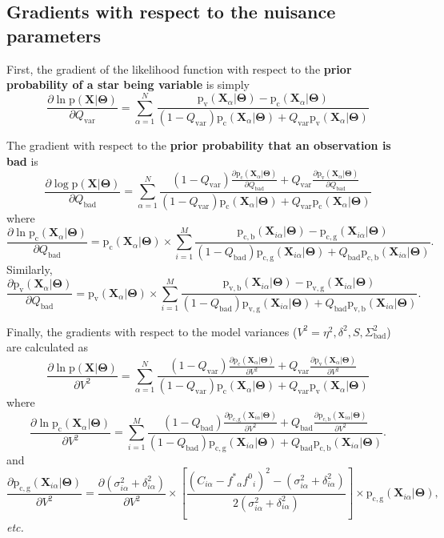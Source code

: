\documentclass[12pt,preprint]{aastex}
\newcommand{\foreign}[1]{\emph{#1}}
\newcommand{\paramvector}[1]{\boldsymbol{#1}}
\newcommand{\grad}[2]{\frac{\partial #1}{\partial #2}}
\renewcommand{\Pr}{\mathrm{p}}
\newcommand{\model}     {\ensuremath{\paramvector{\Theta}} }
\newcommand{\data}      {\ensuremath{\mathbf{X}} }
\newcommand{\X}         {\ensuremath{\mathbf{X}} }
\newcommand{\fstar}     {\ensuremath{f^*} }
\newcommand{\fzero}     {\ensuremath{f^0}}
\newcommand{\jabs}      {\ensuremath{\delta} }
\newcommand{\jrel}      {\ensuremath{\eta} }
\newcommand{\jitter}[1] {\ensuremath{\delta_{#1}^2} }
\newcommand{\Stot}      {\ensuremath{\sigma_{i\alpha}^2 + \jitter{i\alpha}} }
\newcommand{\Sbad}      {\ensuremath{\Sigma_\mathrm{bad}^2} }
\newcommand{\Qbad}      {\ensuremath{Q_\mathrm{bad}} }
\newcommand{\Qvar}      {\ensuremath{Q_\mathrm{var}} }
\newcommand{\Svar}      {\ensuremath{S} }
\newcommand{\pconst}    {\ensuremath{\Pr_\mathrm{c} (\X_\alpha | \model) }}
\newcommand{\pvar}      {\ensuremath{\Pr_\mathrm{v} (\X_\alpha | \model) }}
\newcommand{\pvarbad}   {\ensuremath{\Pr_\mathrm{v,b} (\X_{i\alpha} | \model)} }
\newcommand{\pvargood}  {\ensuremath{\Pr_\mathrm{v,g} (\X_{i\alpha} | \model)} }
\newcommand{\pconstbad} {\ensuremath{\Pr_\mathrm{c,b} (\X_{i\alpha} | \model)} }
\newcommand{\pconstgood}{\ensuremath{\Pr_\mathrm{c,g} (\X_{i\alpha} | \model)} }
\begin{document}
\subsection{Gradients with respect to the nuisance parameters}

First, the gradient of the likelihood function with respect to the {\bf prior
probability of a star being variable} is simply
\begin{equation}
    \grad{\ln \Pr (\data | \model)}{\Qvar} =
        \sum_{\alpha = 1}^{N} \frac{\pvar - \pconst}{ (1-\Qvar)
            \pconst  + \Qvar
            \pvar}
\end{equation}

The gradient with respect to the {\bf prior probability that an observation is
bad} is
\begin{equation}
    \grad{\log \Pr (\data | \model)}{\Qbad} =
        \sum_{\alpha = 1}^{N} \frac{(1-\Qvar)
            \grad{\pconst}{\Qbad}  + \Qvar
            \grad{\pvar}{\Qbad}}{ (1-\Qvar) \pconst  + \Qvar \pconst}
\end{equation}
where
\begin{equation}
    \grad{\ln \pconst}{\Qbad} = \pconst \times
        \sum_{i = 1}^{M} \frac{\pconstbad - \pconstgood}{ (1-\Qbad)
            \pconstgood  + \Qbad
            \pconstbad}.
\end{equation}
Similarly,
\begin{equation}
    \grad{\pvar}{\Qbad} = \pvar \times
        \sum_{i = 1}^{M} \frac{\pvarbad - \pvargood}{ (1-\Qbad)
            \pvargood  + \Qbad
            \pvarbad}.
\end{equation}

Finally, the gradients with respect to the model variances ($V^2 = \jrel^2, \jabs^2, \Svar, \Sbad$)
are calculated as
\begin{equation}
    \grad{\ln \Pr (\data | \model)}{V^2} = \sum_{\alpha=1}^{N}
        \frac{(1-\Qvar)\grad{\pconst}{V^2} + \Qvar \grad{\pvar}{V^2}}
            { (1-\Qvar)\pconst + \Qvar\pvar}
\end{equation}
where
\begin{equation}
    \grad{\ln \pconst}{V^2} =
        \sum_{i = 1}^{M}
            \frac{(1-\Qbad)\grad{\pconstgood}{V^2}
                + \Qbad \grad{\pconstbad}{V^2}}{ (1-\Qbad)
            \pconstgood  + \Qbad
            \pconstbad}.
\end{equation}
and
\begin{equation}
    \grad{\pconstgood}{V^2} = \grad{(\Stot)}{V^2} \times
        \left [ \frac{(C_{i\alpha} - \fstar_\alpha \fzero_i)^2-(\Stot)}{2(\Stot)} \right ]
        \times \pconstgood,
\end{equation}
\foreign{etc.}
\end{document}
